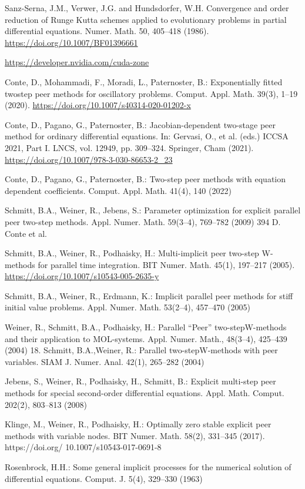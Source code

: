 \begin{thebibliography}{30}
 Sanz-Serna, J.M., Verwer, J.G. and Hundsdorfer, W.H. Convergence and order reduction of Runge Kutta schemes applied to evolutionary problems in partial differential equations. Numer. Math. 50, 405–418 (1986). \url{https://doi.org/10.1007/BF01396661}

 \url{https://developer.nvidia.com/cuda-zone}

 Conte, D., Mohammadi, F., Moradi, L., Paternoster, B.: Exponentially fitted twostep
peer methods for oscillatory problems. Comput. Appl. Math. 39(3), 1–19
(2020). \url{https://doi.org/10.1007/s40314-020-01202-x}

 Conte, D., Pagano, G., Paternoster, B.: Jacobian-dependent two-stage peer method
for ordinary differential equations. In: Gervasi, O., et al. (eds.) ICCSA 2021, Part I.
LNCS, vol. 12949, pp. 309–324. Springer, Cham (2021). \url{https://doi.org/10.1007/978-3-030-86653-2_23}

 Conte, D., Pagano, G., Paternoster, B.: Two-step peer methods with equation dependent
coefficients. Comput. Appl. Math. 41(4), 140 (2022)

 Schmitt, B.A., Weiner, R., Jebens, S.: Parameter optimization for explicit parallel
peer two-step methods. Appl. Numer. Math. 59(3–4), 769–782 (2009)
394 D. Conte et al.

 Schmitt, B.A., Weiner, R., Podhaisky, H.: Multi-implicit peer two-step W-methods
for parallel time integration. BIT Numer. Math. 45(1), 197–217 (2005). \url{https://doi.org/10.1007/s10543-005-2635-y}

 Schmitt, B.A., Weiner, R., Erdmann, K.: Implicit parallel peer methods for stiff
initial value problems. Appl. Numer. Math. 53(2–4), 457–470 (2005)

 Weiner, R., Schmitt, B.A., Podhaisky, H.: Parallel “Peer” two-stepW-methods and
their application to MOL-systems. Appl. Numer. Math., 48(3–4), 425–439 (2004)
18. Schmitt, B.A.,Weiner, R.: Parallel two-stepW-methods with peer variables. SIAM
J. Numer. Anal. 42(1), 265–282 (2004)

 Jebens, S., Weiner, R., Podhaisky, H., Schmitt, B.: Explicit multi-step peer methods
for special second-order differential equations. Appl. Math. Comput. 202(2),
803–813 (2008)

 Klinge, M., Weiner, R., Podhaisky, H.: Optimally zero stable explicit peer methods
with variable nodes. BIT Numer. Math. 58(2), 331–345 (2017). https://doi.org/
10.1007/s10543-017-0691-8

 Rosenbrock, H.H.: Some general implicit processes for the numerical solution of differential equations. Comput. J. 5(4), 329–330 (1963)

\end{thebibliography}
